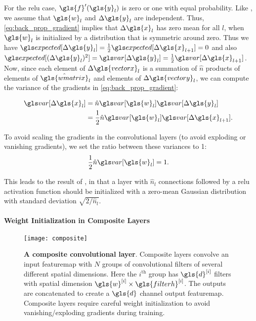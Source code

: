 \documentclass[thesis]{subfiles}
\begin{document}
    For the \gls{relu} case, $\gls{f}'(\gls{y}_l)$ is zero or one with equal probability. 
    Like \citet{glorot2010understanding}, we assume that $\gls{w}_l$ and $\Delta \gls{y}_l$ are independent. Thus, \cref{eq:back_prop_gradient} implies that $\Delta \gls{x}_l$ has zero mean for all $l$, when $\gls{w}_l$ is initialized by a distribution that is symmetric around zero. Thus we have $\Expect{}[\Delta \gls{y}_l] = \frac{1}{2}\Expect{}[\Delta \gls{x}_{l+1}]= 0$ and also $\Expect{}[(\Delta \gls{y}_l)^2] = \Var{}[\Delta \gls{y}_l] = \frac{1}{2} \Var{}[\Delta \gls{x}_{l+1}]$. Now, since each element of $\Delta \gls{vectorx}_l$ is a summation of $\hat n$ products of elements of $\hat{\gls{wmatrix}}_l$ and elements of $\Delta \gls{vectory}_l$, we can compute the variance of the gradients in \cref{eq:back_prop_gradient}:
    
    \begin{equation}
    \begin{aligned}
    \Var{}[\Delta \gls{x}_l] &=  \hat{n} \Var{}[\gls{w}_l] \Var{}[\Delta \gls{y}_l]\\
    &= \frac{1}{2}   \hat{n} \Var{}[\gls{w}_l] \Var{} [\Delta \gls{x}_{l+1}].
    \end{aligned}
    \end{equation}
    
    
    To avoid scaling the gradients in the convolutional layers (to avoid exploding or vanishing gradients), we set the ratio between these variances to 1:
    \begin{equation}
    \frac{1}{2} \hat{n} \Var{}[\gls{w}_l] = 1.
    \end{equation}
    
    This leads to the result of \citet{He2015b}, in that a layer with $\hat{n}_l$ connections followed by a \gls{relu} activation function should be initialized with a zero-mean Gaussian distribution with standard deviation $\sqrt{2/ \hat{n}_l}$.
    
    \paragraph{Weight Initialization in Composite Layers}
    \begin{figure}[tbp]
        \centering
        \texttt{[image: composite]}
        \caption[A composite convolutional layer]{{\bf A composite convolutional layer}. Composite layers convolve an input \gls{featuremap} with $N$ groups of convolutional filters of several different spatial dimensions. Here the $i^\text{th}$ group has $\gls{d}^{[i]}$ filters with spatial dimension $\gls{w}^{[i]} \times \gls{filterh}^{[i]}$. The outputs are concatenated to create a $\gls{d}$ channel output \gls{featuremap}. Composite layers require careful weight initialization to avoid vanishing/exploding gradients during training.}
        \label{fig:compositelayers}
    \end{figure}
    
\end{document}
